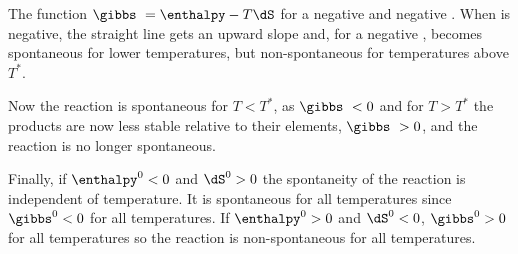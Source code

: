 \documentclass[../mit-general-chemistry.tex]{subfiles}
\begin{document}
\begin{hfigure}
  \begin{center}
  \end{center}
  
  \caption{The function $\gibbs\ = \enthalpy - T \dS$ for a negative
    \dS and negative \enthalpy. When \dS is negative, the straight
    line gets an upward slope and, for a negative \enthalpy, becomes
    spontaneous for lower temperatures, but non-spontaneous for
    temperatures above $T^*$.}
\end{hfigure}

Now the reaction is spontaneous for $T < T^*$, as $\gibbs\ < 0$ and for
$T > T^*$ the products are now less stable relative to their elements,
$\gibbs\ > 0$, and the reaction is no longer spontaneous.

Finally, if $\enthalpy^0 < 0$ and $\dS^0 > 0$ the spontaneity of the
reaction is independent of temperature. It is spontaneous for all
temperatures since $\gibbs^0 < 0$ for all temperatures. If
$\enthalpy^0 > 0$ and $\dS^0 < 0$, $\gibbs^0 > 0$ for all temperatures
so the reaction is non-spontaneous for all temperatures.
\end{document}
